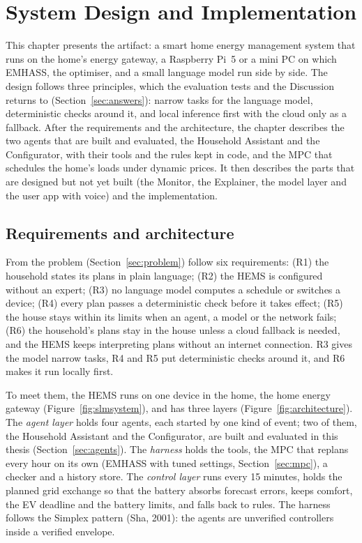 \documentclass[12pt,a4paper]{report}
\begin{document}
\chapter{System Design and Implementation}
\label{ch:design}

This chapter presents the artifact: a smart home energy management
system that runs on the home's energy gateway, a Raspberry Pi~5 or a
mini PC on which EMHASS, the optimiser, and a small language model run
side by side. The design follows three principles, which the
evaluation tests and the Discussion returns to
(Section~\ref{sec:answers}): narrow tasks for the language model,
deterministic checks around it, and local inference first with the
cloud only as a fallback. After the requirements and the architecture,
the chapter describes the two agents that are built and evaluated, the
Household Assistant and the Configurator, with their tools and the
rules kept in code, and the MPC that schedules the home's loads under
dynamic prices. It then describes the parts that are designed but
not yet built (the Monitor, the Explainer, the model layer and the user
app with voice) and the implementation.

\section{Requirements and architecture}
\label{sec:architecture}

From the problem (Section~\ref{sec:problem}) follow six requirements:
(R1) the household states its plans in plain language; (R2) the HEMS
is configured without an expert; (R3) no language model computes a
schedule or switches a device; (R4) every plan passes a deterministic
check before it takes effect; (R5) the house stays within its limits
when an agent, a model or the network fails; (R6) the household's plans
stay in the house unless a cloud fallback is needed, and the HEMS
keeps interpreting plans without an internet connection. R3 gives the
model narrow tasks, R4 and R5 put deterministic checks around it, and
R6 makes it run locally first.

To meet them, the HEMS runs on one device in the home, the home energy
gateway (Figure~\ref{fig:slmsystem}), and has three layers
(Figure~\ref{fig:architecture}). The
\textit{agent layer} holds four agents, each started by one kind of
event; two of them, the Household Assistant and the Configurator, are
built and evaluated in this thesis (Section~\ref{sec:agents}). The \textit{harness} holds the tools, the MPC that replans every hour
on its own (EMHASS with tuned settings, Section~\ref{sec:mpc}), a
checker and a history store. The
\textit{control layer} runs every 15 minutes, holds the planned grid
exchange so that the battery absorbs forecast errors, keeps comfort,
the EV deadline and the battery limits, and falls back to rules. The
harness follows the Simplex pattern (Sha, 2001): the agents are
unverified controllers inside a verified envelope.
\end{document}
